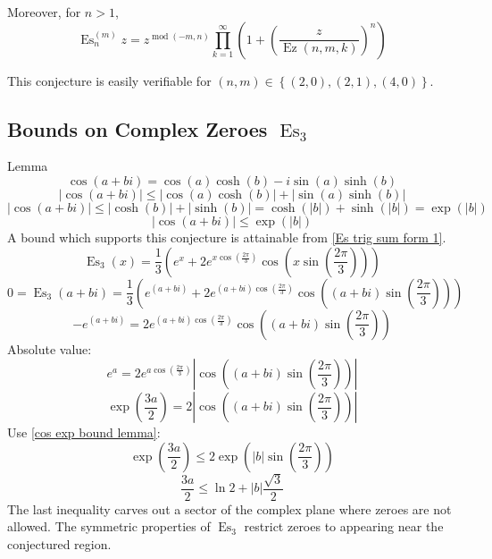 \documentclass[]{article}
\DeclareMathOperator{\es}{Es}
\DeclareMathOperator{\ez}{Ez}
\DeclareMathOperator{\md}{mod}
\newcommand{\pqty}[1]{{\left(#1\right)}}
\newcommand{\Bqty}[1]{{\left\{#1\right\}}}
\newcommand{\abs}[1]{{\left\lvert#1\right\rvert}}
\begin{document}
	Moreover, for $n>1$,
	\begin{equation}
	\es_n^{(m)}z=z^{\md\pqty{-m,n}}\prod_{k=1}^{\infty}\pqty{1+\pqty{\frac{z}{\ez\pqty{n,m,k}}}^n}
	\end{equation}
	
	This conjecture is easily verifiable for $\pqty{n,m}\in\Bqty{\pqty{2,0}, \pqty{2,1}, \pqty{4,0}}$.
	
	\subsection{Bounds on Complex Zeroes \(\es_3\)}
	Lemma
	\begin{equation}
	\cos\pqty{a+bi}=\cos\pqty{a}\cosh\pqty{b}-i\sin\pqty{a}\sinh\pqty{b}
	\end{equation}
	\begin{equation}
	\abs{\cos\pqty{a+bi}} \leq \abs{\cos\pqty{a}\cosh\pqty{b}}+\abs{\sin\pqty{a}\sinh\pqty{b}}
	\end{equation}
	\begin{equation}
	\abs{\cos\pqty{a+bi}} \leq \abs{\cosh\pqty{b}}+\abs{\sinh\pqty{b}}
	= \cosh\pqty{\abs{b}}+{\sinh\pqty{\abs{b}}} = \exp\pqty{\abs{b}}
	\end{equation}
	\begin{equation}
	\label{cos exp bound lemma}
	\abs{\cos\pqty{a+bi}} \leq \exp\pqty{\abs{b}}
	\end{equation}
	A bound which supports this conjecture is attainable from \eqref{Es trig sum form 1}.
	\begin{equation}
	\es_3\pqty{x}=
	\frac{1}{3}\pqty{
		e^x
		+2e^{x\cos\pqty{\frac{2\pi}{3}}} \cos\pqty{x\sin\pqty{\frac{2\pi}{3}}}
	}
	\end{equation}
	\begin{equation}
	0=\es_3\pqty{a+bi}=
	\frac{1}{3}\pqty{
		e^\pqty{a+bi}
		+2e^{\pqty{a+bi}\cos\pqty{\frac{2\pi}{3}}} \cos\pqty{\pqty{a+bi}\sin\pqty{\frac{2\pi}{3}}}
	}
	\end{equation}
	\begin{equation}
	-e^\pqty{a+bi}=
	2e^{\pqty{a+bi}\cos\pqty{\frac{2\pi}{3}}} \cos\pqty{\pqty{a+bi}\sin\pqty{\frac{2\pi}{3}}}
	\end{equation}
	Absolute value:
	\begin{equation}
	e^{a}=
	2e^{{a}\cos\pqty{\frac{2\pi}{3}}} \abs{\cos\pqty{\pqty{a+bi}\sin\pqty{\frac{2\pi}{3}}}}
	\end{equation}
	\begin{equation}
	\exp\pqty{\frac{3a}{2}}=
	2 \abs{\cos\pqty{\pqty{a+bi}\sin\pqty{\frac{2\pi}{3}}}}
	\end{equation}
	Use \eqref{cos exp bound lemma}:
	\begin{equation}
	\exp\pqty{\frac{3a}{2}} \leq
	2 {\exp\pqty{\abs{b}\sin\pqty{\frac{2\pi}{3}}}}
	\end{equation}
	\begin{equation}
	{\frac{3a}{2}} \leq
	\ln{2}+ {\abs{b}\frac{\sqrt{3}}{2}}
	\end{equation}
	The last inequality carves out a sector of the complex plane where zeroes are not allowed. The symmetric properties of \(\es_3\) restrict zeroes to appearing near the conjectured region.
	
\end{document}
